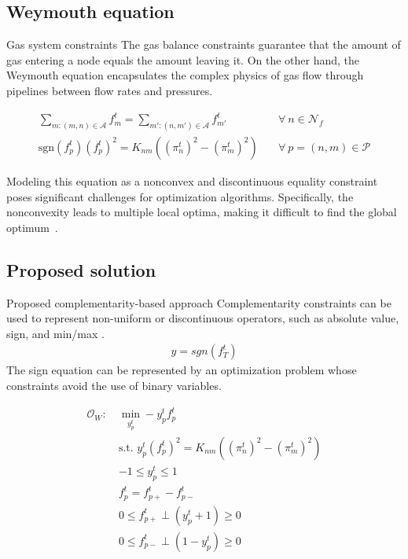 \documentclass[hyperref={colorlinks,citecolor=blue,linkcolor=blue,urlcolor=blue}]{beamer}
\begin{document}
\subsection{Weymouth equation}

\begin{frame}{Gas system constraints}
The gas balance constraints guarantee that the amount of gas entering a node equals the amount leaving it. On the other hand, the Weymouth equation encapsulates the complex physics of gas flow through pipelines between flow rates and pressures. 

\begin{subequations}
\begin{align}
    \sum_{m:(m,n)\in\mathcal{A}}{f_{m}^t} = \sum_{m':(n,m')\in\mathcal{A}}{f_{m'}^t} &\quad \forall \ n \in \mathcal{N}_f \label{eq:gas_balance} \\
    \text{sgn}(f_{p}^t)(f_{p}^t)^2 = K_{nm}((\pi_{n}^t)^2 - (\pi_{m}^t)^2) &\quad \forall \ p =(n,m) \in \mathcal{P} \label{eq:weymouth_cons}
\end{align}
\end{subequations}

Modeling this equation as a nonconvex and discontinuous equality constraint poses significant challenges for optimization algorithms. Specifically, the nonconvexity leads to multiple local optima, making it difficult to find the global optimum~\cite{JIANG2021106460}.
\end{frame}



\subsection{Proposed solution}
\begin{frame}{Proposed complementarity-based approach}
     Complementarity constraints can be used to represent non-uniform or discontinuous operators, such as absolute value, sign, and min/max \cite{mpcc}.
    \begin{gather}
            y = sgn(f_{T}^t)  \label{eq:sign}
    \end{gather}
    The sign equation can be represented by an optimization problem whose constraints avoid the use of binary variables.

\begin{subequations}
\begin{alignat}{4}
\label{eq:complementarity_relaxec3}
\mathcal{O}_W: \ &\min\limits_{y_p^t} -y_p^tf_{p}^t \\
& \text{s.t. } y_p^t(f_{p}^t)^2 = K_{nm}((\pi_{n}^t)^2-(\pi_{m}^t)^2)\\
& -1 \leq y_p^t \leq 1 \\
&f_{p}^t = f_{p+}^t - f_{p-}^t\\
& 0 \leq f_{p+}^t \perp (y_p^t+1) \geq 0 \\
& 0 \leq f_{p-}^t \perp (1-y_p^t) \geq 0
\end{alignat}
\end{subequations}

\end{frame}
\end{document}
